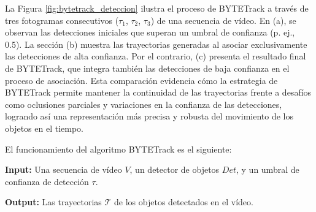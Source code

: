 \documentclass[11pt,spanish,listoffigures,listoftables]{tfgetsinf}
\begin{document}
La Figura \ref{fig:bytetrack_deteccion} ilustra el proceso de BYTETrack a través de tres fotogramas consecutivos ($\tau_1$, $\tau_2$, $\tau_3$) de una secuencia de vídeo. En (a), se observan las detecciones iniciales que superan un umbral de confianza (p. ej., 0.5). La sección (b) muestra las trayectorias generadas al asociar exclusivamente las detecciones de alta confianza. Por el contrario, (c) presenta el resultado final de BYTETrack, que integra también las detecciones de baja confianza en el proceso de asociación. Esta comparación evidencia cómo la estrategia de BYTETrack permite mantener la continuidad de las trayectorias frente a desafíos como oclusiones parciales y variaciones en la confianza de las detecciones, logrando así una representación más precisa y robusta del movimiento de los objetos en el tiempo.



El funcionamiento del algoritmo BYTETrack es el siguiente:

\textbf{Input:} Una secuencia de vídeo $V$, un detector de objetos $Det$, y un umbral de confianza de detección $\tau$.

\textbf{Output:} Las trayectorias $\mathcal{T}$ de los objetos detectados en el vídeo.
\end{document}
